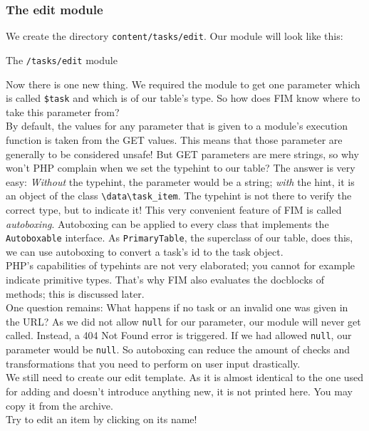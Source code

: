 \documentclass{scrartcl}
\begin{document}
   \subsubsection{The edit module}
      We create the directory \texttt{content/tasks/edit}. Our module will look like this:
      \begin{listing}[H]
         \caption{The \texttt{/tasks/edit} module}
      \end{listing}
      Now there is one new thing. We required the module to get one parameter which is called \lstinline!$task! and which is of our table's type. So how does FIM know where to take this parameter from? \\
      By default, the values for any parameter that is given to a module's execution function is taken from the GET values. This means that those parameter are generally to be considered unsafe! But GET parameters are mere strings, so why won't PHP complain when we set the typehint to our table? The answer is very easy: \emph{Without} the typehint, the parameter would be a string; \emph{with} the hint, it is an object of the class \lstinline!\data\task_item!. The typehint is not there to verify the correct type, but to indicate it! This very convenient feature of FIM is called \emph{autoboxing}. Autoboxing can be applied to every class that implements the \lstinline!Autoboxable! interface. As \lstinline!PrimaryTable!, the superclass of our table, does this, we can use autoboxing to convert a task's id to the task object. \\
      PHP's capabilities of typehints are not very elaborated; you cannot for example indicate primitive types. That's why FIM also evaluates the docblocks of methods; this is discussed later. \\
      One question remains: What happens if no task or an invalid one was given in the URL? As we did not allow \lstinline!null! for our parameter, our module will never get called. Instead, a 404 Not Found error is triggered. If we had allowed \lstinline!null!, our parameter would be \lstinline!null!. So autoboxing can reduce the amount of checks and transformations that you need to perform on user input drastically. \\
      We still need to create our edit template. As it is almost identical to the one used for adding and doesn't introduce anything new, it is not printed here. You may copy it from the archive. \\
      Try to edit an item by clicking on its name!
\end{document}
